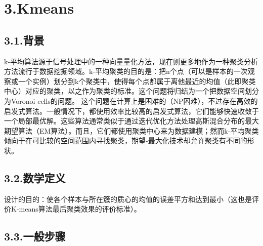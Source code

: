 \documentclass[a4paper, 12pt]{ctexart}
\begin{document}
\section{3.\hspace*{0.5em}Kmeans}\label{sec-kmeans}%

\subsection{3.1.\hspace*{0.5em}背景}\label{section}%

\noindent{}k-平均算法源于信号处理中的一种向量量化方法，现在则更多地作为一种聚类分析方法流行于数据挖掘领域。k-平均聚类的目的是：把n个点（可以是样本的一次观察或一个实例）划分到k个聚类中，使得每个点都属于离他最近的均值（此即聚类中心）对应的聚类，以之作为聚类的标准。这个问题将归结为一个把数据空间划分为Voronoi cells的问题。
这个问题在计算上是困难的（NP困难），不过存在高效的启发式算法。一般情况下，都使用效率比较高的启发式算法，它们能够快速收敛于一个局部最优解。这些算法通常类似于通过迭代优化方法处理高斯混合分布的最大期望算法（EM算法）。而且，它们都使用聚类中心来为数据建模；然而k-平均聚类倾向于在可比较的空间范围内寻找聚类，期望-最大化技术却允许聚类有不同的形状。%

\subsection{3.2.\hspace*{0.5em}数学定义}\label{section}%

\noindent{}设计的目的：使各个样本与所在簇的质心的均值的误差平方和达到最小（这也是评价K-means算法最后聚类效果的评价标准）。%


\subsection{3.3.\hspace*{0.5em}一般步骤}\label{section}%
\end{document}
